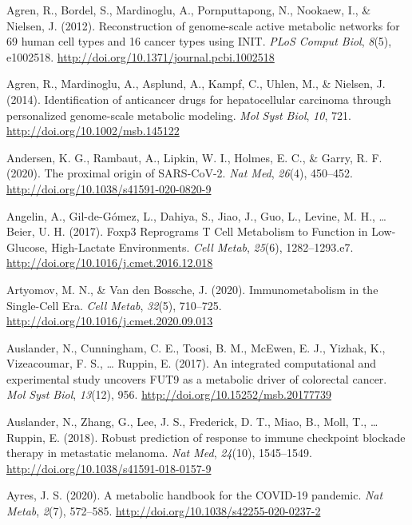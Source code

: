 \documentclass[12pt,twoside,openany,\mydriver]{thesis}  %
\begin{document}
\leavevmode\hypertarget{ref-agren_reconstruction_2012}{}%
Agren, R., Bordel, S., Mardinoglu, A., Pornputtapong, N., Nookaew, I., \& Nielsen, J. (2012). Reconstruction of genome-scale active metabolic networks for 69 human cell types and 16 cancer types using INIT. \emph{PLoS Comput Biol}, \emph{8}(5), e1002518. \url{http://doi.org/10.1371/journal.pcbi.1002518}

\leavevmode\hypertarget{ref-agren_identification_2014}{}%
Agren, R., Mardinoglu, A., Asplund, A., Kampf, C., Uhlen, M., \& Nielsen, J. (2014). Identification of anticancer drugs for hepatocellular carcinoma through personalized genome-scale metabolic modeling. \emph{Mol Syst Biol}, \emph{10}, 721. \url{http://doi.org/10.1002/msb.145122}

\leavevmode\hypertarget{ref-andersen_proximal_2020}{}%
Andersen, K. G., Rambaut, A., Lipkin, W. I., Holmes, E. C., \& Garry, R. F. (2020). The proximal origin of SARS-CoV-2. \emph{Nat Med}, \emph{26}(4), 450--452. \url{http://doi.org/10.1038/s41591-020-0820-9}

\leavevmode\hypertarget{ref-angelin_foxp3_2017}{}%
Angelin, A., Gil-de-Gómez, L., Dahiya, S., Jiao, J., Guo, L., Levine, M. H., \ldots{} Beier, U. H. (2017). Foxp3 Reprograms T Cell Metabolism to Function in Low-Glucose, High-Lactate Environments. \emph{Cell Metab}, \emph{25}(6), 1282--1293.e7. \url{http://doi.org/10.1016/j.cmet.2016.12.018}

\leavevmode\hypertarget{ref-artyomov_immunometabolism_2020}{}%
Artyomov, M. N., \& Van den Bossche, J. (2020). Immunometabolism in the Single-Cell Era. \emph{Cell Metab}, \emph{32}(5), 710--725. \url{http://doi.org/10.1016/j.cmet.2020.09.013}

\leavevmode\hypertarget{ref-auslander_integrated_2017}{}%
Auslander, N., Cunningham, C. E., Toosi, B. M., McEwen, E. J., Yizhak, K., Vizeacoumar, F. S., \ldots{} Ruppin, E. (2017). An integrated computational and experimental study uncovers FUT9 as a metabolic driver of colorectal cancer. \emph{Mol Syst Biol}, \emph{13}(12), 956. \url{http://doi.org/10.15252/msb.20177739}

\leavevmode\hypertarget{ref-auslander_robust_2018}{}%
Auslander, N., Zhang, G., Lee, J. S., Frederick, D. T., Miao, B., Moll, T., \ldots{} Ruppin, E. (2018). Robust prediction of response to immune checkpoint blockade therapy in metastatic melanoma. \emph{Nat Med}, \emph{24}(10), 1545--1549. \url{http://doi.org/10.1038/s41591-018-0157-9}

\leavevmode\hypertarget{ref-ayres_metabolic_2020}{}%
Ayres, J. S. (2020). A metabolic handbook for the COVID-19 pandemic. \emph{Nat Metab}, \emph{2}(7), 572--585. \url{http://doi.org/10.1038/s42255-020-0237-2}
\end{document}
